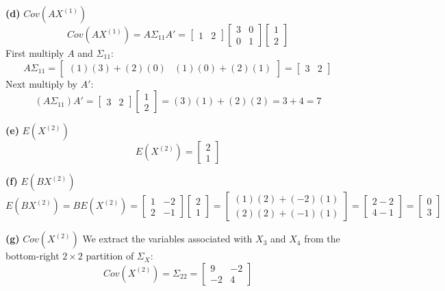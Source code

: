 \documentclass{article}
\begin{document}
\noindent \textbf{(d)} $Cov(AX^{(1)})$
\[
Cov(AX^{(1)}) = A \Sigma_{11} A' = \begin{bmatrix} 1 & 2 \end{bmatrix} \begin{bmatrix} 3 & 0 \\ 0 & 1 \end{bmatrix} \begin{bmatrix} 1 \\ 2 \end{bmatrix} 
\]
First multiply $A$ and $\Sigma_{11}$:
\[
A \Sigma_{11} = \begin{bmatrix} (1)(3)+(2)(0) & (1)(0)+(2)(1) \end{bmatrix} = \begin{bmatrix} 3 & 2 \end{bmatrix}
\]
Next multiply by $A'$:
\[
(A \Sigma_{11}) A' = \begin{bmatrix} 3 & 2 \end{bmatrix} \begin{bmatrix} 1 \\ 2 \end{bmatrix} = (3)(1) + (2)(2) = 3 + 4 = 7
\]

\noindent \textbf{(e)} $E(X^{(2)})$
\[
E(X^{(2)}) = \begin{bmatrix} 2 \\ 1 \end{bmatrix}
\]

\noindent \textbf{(f)} $E(BX^{(2)})$
\[
E(BX^{(2)}) = B E(X^{(2)}) = \begin{bmatrix} 1 & -2 \\ 2 & -1 \end{bmatrix} \begin{bmatrix} 2 \\ 1 \end{bmatrix} = \begin{bmatrix} (1)(2) + (-2)(1) \\ (2)(2) + (-1)(1) \end{bmatrix} = \begin{bmatrix} 2 - 2 \\ 4 - 1 \end{bmatrix} = \begin{bmatrix} 0 \\ 3 \end{bmatrix}
\]

\noindent \textbf{(g)} $Cov(X^{(2)})$
We extract the variables associated with $X_3$ and $X_4$ from the bottom-right $2 \times 2$ partition of $\Sigma_X$:
\[
Cov(X^{(2)}) = \Sigma_{22} = \begin{bmatrix} 9 & -2 \\ -2 & 4 \end{bmatrix}
\]
\end{document}
